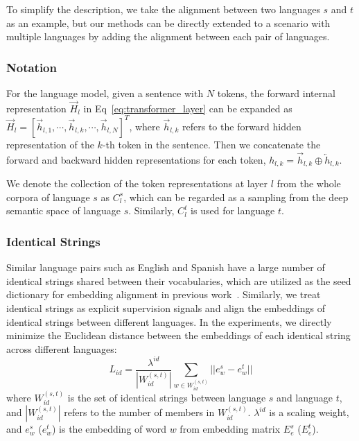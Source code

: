 \documentclass[11pt,a4paper]{article}
\begin{document}
	To simplify the description, we take the alignment between two languages $s$ and $t$ as an example, but our methods can be directly extended to a scenario with multiple languages by adding the alignment between each pair of languages.
	
	\subsubsection*{Notation}
	For the language model, given a sentence with $N$ tokens, the forward internal representation  $\overrightarrow{H}_l$ in Eq~\eqref{eq:transformer_layer} can be expanded as $\overrightarrow{H}_l = [\overrightarrow{h}_{l,1}, \cdots, \overrightarrow{h}_{l,k}, \cdots, \overrightarrow{h}_{l,N}]^T$, where $\overrightarrow{h}_{l,k}$ refers to the forward hidden representation of the $k$-th token in the sentence. Then we concatenate the forward and backward hidden representations for each token, $h_{l,k} = \overrightarrow{h}_{l,k} \oplus \overleftarrow{h}_{l,k}$.
	
	We denote the collection of the token representations at layer $l$ from the whole corpora of language $s$ as $C_l^s$, which can be regarded as a sampling from the deep semantic space of language $s$. Similarly, $C_l^t$ is used for language $t$.
	
	\subsubsection*{Identical Strings}
	Similar language pairs such as English and Spanish have a large number of identical strings shared between their vocabularies, which are utilized as the seed dictionary for embedding alignment in previous work~\cite{smith2017offline}. Similarly, we treat identical strings as explicit supervision signals and align the embeddings of identical strings between different languages. %
	In the experiments, we directly minimize the Euclidean distance between the embeddings of each identical string across different languages:
	\begin{equation*}
	L_{id} = \dfrac{\lambda^{id}}{| W_{id}^{(s,t)} |} \sum_{w \in W_{id}^{(s,t)}} ||e_{w}^s - e_{w}^t||
	\end{equation*}
	where $W_{id}^{(s,t)}$ is the set of identical strings between language $s$ and language $t$, and $|W_{id}^{(s,t)}|$ refers to the number of members in $W_{id}^{(s,t)}$. $\lambda^{id}$ is a scaling weight, and $e_{w}^s$ ($e_{w}^t$) is the embedding of word $w$ from embedding matrix $E_e^s$ ($E_e^t$). 
	
\end{document}
